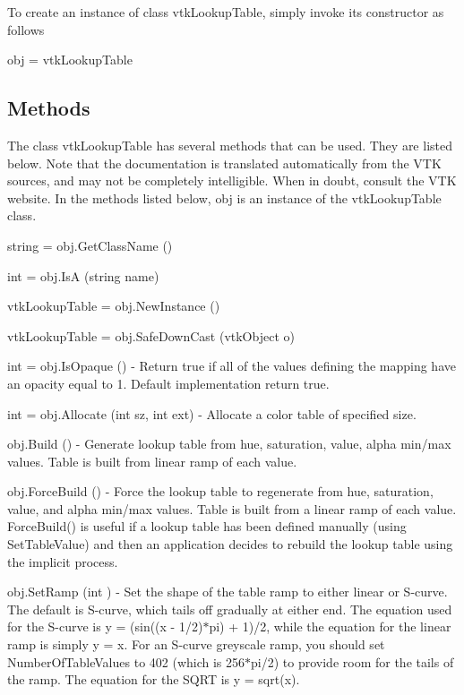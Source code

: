 To create an instance of class vtk\-Lookup\-Table, simply invoke its constructor as follows \begin{DoxyVerb}  obj = vtkLookupTable
\end{DoxyVerb}
 \hypertarget{vtkwidgets_vtkxyplotwidget_Methods}{}\subsection{Methods}\label{vtkwidgets_vtkxyplotwidget_Methods}
The class vtk\-Lookup\-Table has several methods that can be used. They are listed below. Note that the documentation is translated automatically from the V\-T\-K sources, and may not be completely intelligible. When in doubt, consult the V\-T\-K website. In the methods listed below, {\ttfamily obj} is an instance of the vtk\-Lookup\-Table class. 
\begin{DoxyItemize}
\item {\ttfamily string = obj.\-Get\-Class\-Name ()}  
\item {\ttfamily int = obj.\-Is\-A (string name)}  
\item {\ttfamily vtk\-Lookup\-Table = obj.\-New\-Instance ()}  
\item {\ttfamily vtk\-Lookup\-Table = obj.\-Safe\-Down\-Cast (vtk\-Object o)}  
\item {\ttfamily int = obj.\-Is\-Opaque ()} -\/ Return true if all of the values defining the mapping have an opacity equal to 1. Default implementation return true.  
\item {\ttfamily int = obj.\-Allocate (int sz, int ext)} -\/ Allocate a color table of specified size.  
\item {\ttfamily obj.\-Build ()} -\/ Generate lookup table from hue, saturation, value, alpha min/max values. Table is built from linear ramp of each value.  
\item {\ttfamily obj.\-Force\-Build ()} -\/ Force the lookup table to regenerate from hue, saturation, value, and alpha min/max values. Table is built from a linear ramp of each value. Force\-Build() is useful if a lookup table has been defined manually (using Set\-Table\-Value) and then an application decides to rebuild the lookup table using the implicit process.  
\item {\ttfamily obj.\-Set\-Ramp (int )} -\/ Set the shape of the table ramp to either linear or S-\/curve. The default is S-\/curve, which tails off gradually at either end. The equation used for the S-\/curve is y = (sin((x -\/ 1/2)$\ast$pi) + 1)/2, while the equation for the linear ramp is simply y = x. For an S-\/curve greyscale ramp, you should set Number\-Of\-Table\-Values to 402 (which is 256$\ast$pi/2) to provide room for the tails of the ramp. The equation for the S\-Q\-R\-T is y = sqrt(x).  

\end{DoxyItemize}
